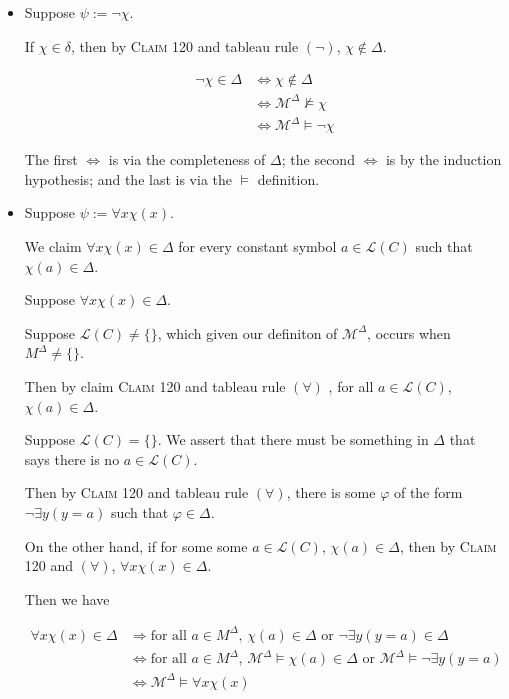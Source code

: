 \documentclass[a4paper]{article}
\newcommand{\MODEL}{\mathcal{M}}
\newcommand{\LANGUAGE}{\mathcal{L}}
\newcommand{\SET}[1]{\{ {#1} \}}
\begin{document}
\begin{enumerate}
\begin{itemize}
    \item Suppose $\psi := \neg \chi$.

    If $\chi \in \delta$, then by \textsc{Claim 120} and tableau rule $(\neg)$, $\chi \not\in \Delta$.

    \begin{align*}
        \neg \chi \in \Delta & \Leftrightarrow  \chi \not\in \Delta\\
        & \Leftrightarrow \MODEL^{\Delta} \not\models \chi\\
        & \Leftrightarrow \MODEL^{\Delta} \models \neg\chi
    \end{align*}


    The first $\Leftrightarrow$ is via the completeness of $\Delta$; the second $\Leftrightarrow$ is by the induction hypothesis; and the last is via the $\models$ definition.

    \item Suppose $\psi := \forall x \chi (x)$.

        We claim $\forall x \chi (x) \in \Delta$ for every constant symbol $a \in \LANGUAGE (C)$ such that $\chi(a) \in \Delta$.

        Suppose $\forall x \chi (x) \in \Delta$. 

        Suppose $\LANGUAGE(C) \neq \SET{}$, which given our definiton of $\MODEL^{\Delta}$, occurs when $M^{\Delta} \neq \SET{}$. 

        Then by claim \textsc{Claim 120} and tableau rule $(\forall)$ , for all $a \in \LANGUAGE(C)$, $\chi(a) \in \Delta$.

        Suppose $\LANGUAGE(C) = \SET{}$. We assert that there must be something in $\Delta$ that says there is no $a \in \LANGUAGE(C)$.
        
        Then by \textsc{Claim 120} and tableau rule $(\forall)$, there is some $\varphi$ of the form $\neg \exists y(y = a)$ such that $\varphi \in \Delta$.

        On the other hand, if for some some $a \in \LANGUAGE(C)$, $\chi (a) \in \Delta$, then by \textsc{Claim 120} and $(\forall)$, $\forall x \chi (x) \in \Delta$. 

        Then we have

    \begin{align*}
        \forall x \chi (x)\in \Delta & \Rightarrow \text{for all } a \in M^{\Delta} \text{, } \chi(a) \in \Delta \text{ or } \neg \exists y(y = a) \in \Delta\\
        & \Leftrightarrow \text{for all } a \in M^{\Delta} \text{, } \MODEL^{\Delta} \models \chi(a) \in \Delta \text{ or } \MODEL^{\Delta} \models \neg \exists y(y = a)\\
        & \Leftrightarrow \MODEL^{\Delta} \models \forall x \chi (x)
    \end{align*}


\end{itemize}
\end{enumerate}
\end{document}
